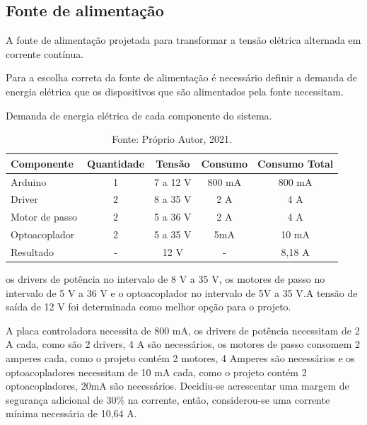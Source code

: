 \subsection{Fonte de alimentação}\label{subsec:metfonte}

A fonte de alimentação projetada para transformar a tensão elétrica alternada em corrente contínua.

Para a escolha correta da fonte de alimentação é necessário definir a demanda de energia elétrica 
que os dispositivos que são alimentados pela fonte necessitam.


\begin{table}
    \centering
    \caption{Demanda de energia elétrica de cada componente do sistema.}
    \begin{tabular}{lcccc}
        \hline
        \textbf{Componente} & \textbf{Quantidade} & \textbf{Tensão} & \textbf{Consumo} & \textbf{Consumo Total}\\
        \hline
        Arduino & 1 & 7 a 12 V & 800 mA & 800 mA\\
        Driver & 2 & 8 a 35 V & 2 A & 4 A\\
        Motor de passo & 2 & 5 a 36 V & 2 A & 4 A\\
        Optoacoplador & 2 & 5 a 35 V & 5mA & 10 mA\\
        Resultado & - & 12 V & - & 8,18 A\\
        \hline       
    \end{tabular}
    \caption*{Fonte: Próprio Autor, 2021.}
    \label{tab:demandafonte}
\end{table}

os drivers de potência no intervalo de 8 V a 35 V, os motores de passo no intervalo de 5 V a 36 V 
e o optoacoplador no intervalo de 5V a 35 V.A tensão de saída de 12 V foi determinada como melhor 
opção para o projeto.

A placa controladora necessita de 800 mA, os drivers de potência necessitam de 2 A cada, como são 2 drivers, 
4 A são necessários, os motores de passo consomem 2 amperes cada, como o projeto contém 2 motores, 4 Amperes 
são necessários e os optoacopladores necessitam de 10 mA cada, como o projeto contém 2 optoacopladores, 
20mA são necessários. Decidiu-se acrescentar uma margem de segurança adicional de 30\% na corrente, 
então, considerou-se uma corrente mínima necessária de 10,64 A.

